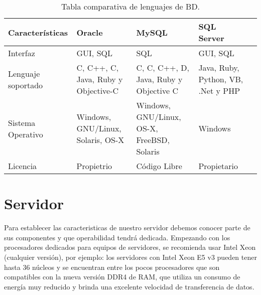 	\begin{table}[htbp]
		\begin{center}
			\begin{tabular}{|l|p{35mm}|p{35mm}|p{35mm}|l}
				\hline
				Caracter\'isticas & Oracle & MySQL & SQL Server \\
				\hline 
				Interfaz & GUI, SQL & SQL & GUI, SQL \\ \hline
				Lenguaje soportado & C, C++, C, Java, Ruby y Objective-C & C, C, C++, D, Java, Ruby y Objective C & Java, Ruby, Python, VB, .Net y PHP  \\ \hline
				Sistema Operativo & Windows, GNU/Linux, Solaris, OS-X & Windows, GNU/Linux, OS-X, FreeBSD, Solaris & Windows \\ \hline
				Licencia & Propietrio & Código Libre & Propietario \\ \hline
			\end{tabular}
			\caption{Tabla comparativa de lenguajes de BD.}
			\label{tabla:sencilla}
		\end{center}
	\end{table}
	\pagebreak
	

	\section{Servidor}
	\noindent Para establecer las caracteristicas de nuestro servidor debemos conocer parte de sus componentes y que operabilidad tendrá dedicada.
	Empezando con los procesadores dedicados para equipos de servidores, se recomienda usar Intel Xeon (cualquier versión), por ejemplo: los servidores con Intel Xeon E5 v3 pueden tener hasta 36 núcleos y se encuentran entre los pocos procesadores que son compatibles con la nueva versión DDR4 de RAM, que utiliza un consumo de energía muy reducido y brinda una excelente velocidad de transferencia de datos.\cite{serv}
	
